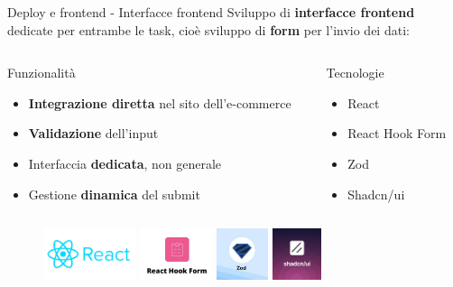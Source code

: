 \documentclass{beamer}
\begin{document}
	\begin{frame}{Deploy e frontend - Interfacce frontend}
		Sviluppo di \textbf{interfacce frontend} dedicate per entrambe le task, cioè sviluppo di \textbf{form} per l'invio dei dati:

		\begin{columns}
			\begin{column}{0.64\textwidth}
				\begin{exampleblock}{Funzionalità}
					\begin{itemize}
						\item \textbf{Integrazione diretta} nel sito dell'e-commerce
						\item \textbf{Validazione} dell'input
						\item Interfaccia \textbf{dedicata}, non generale
						\item Gestione \textbf{dinamica} del submit
					\end{itemize}
				\end{exampleblock}
			\end{column}
			\begin{column}{0.36\textwidth}
				\begin{alertblock}{Tecnologie}
					\begin{itemize}
						\item React
						\item React Hook Form
						\item Zod
						\item Shadcn/ui
					\end{itemize}
				\end{alertblock}
			\end{column}
		\end{columns}

		\begin{figure}
			\centering
			\begin{minipage}{\textwidth}
				\centering
				\includegraphics[height=1.5cm]{react-logo.jpg}\hspace{0.5cm}
				\includegraphics[height=1.5cm]{react-hook-form-logo.jpg}\hspace{0.5cm}
				\includegraphics[height=1.5cm]{zod-logo.jpg}\hspace{0.5cm}
				\includegraphics[height=1.5cm]{shadcn-ui-logo.png}
			\end{minipage}
		\end{figure}
	\end{frame}
\end{document}
